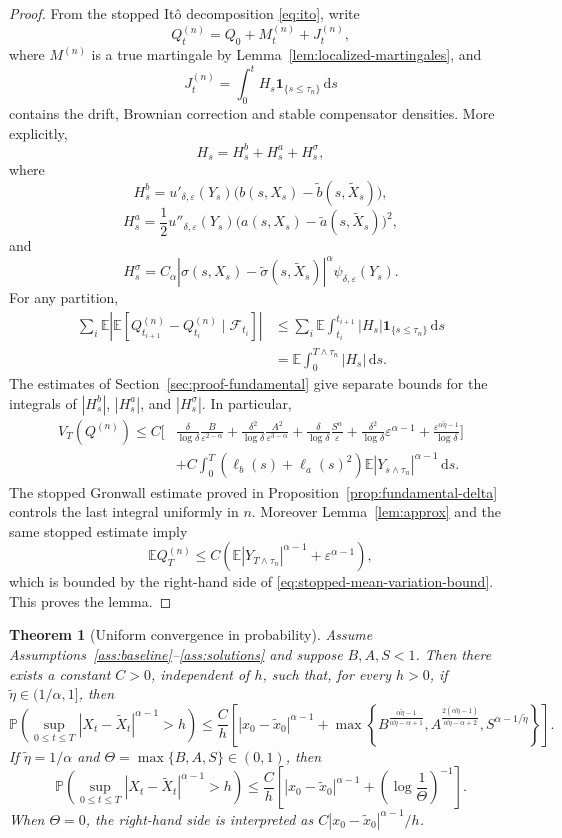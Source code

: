 \documentclass[11pt]{article}
\newtheorem{theorem}{Theorem}[section]
\newcommand{\E}{\mathbb{E}}
\newcommand{\Pbb}{\mathbb{P}}
\newcommand{\F}{\mathcal{F}}
\newcommand{\1}{\mathbf{1}}
\newcommand{\dd}{\,\mathrm{d}}
\newcommand{\wt}{\tilde}
\newcommand{\eps}{\varepsilon}
\begin{document}
\begin{proof}
From the stopped It\^o decomposition \eqref{eq:ito}, write
\[
  Q_t^{(n)}=Q_0+M_t^{(n)}+J_t^{(n)},
\]
where $M^{(n)}$ is a true martingale by Lemma~\ref{lem:localized-martingales}, and
\[
  J_t^{(n)}=\int_0^t H_s\1_{\{s\le\tau_n\}}\dd s
\]
contains the drift, Brownian correction and stable compensator densities. More explicitly,
\[
H_s=H_s^b+H_s^a+H_s^\sigma,
\]
where
\[
H_s^b=u'_{\delta,\eps}(Y_s)\bigl(b(s,X_s)-\wt b(s,\wt X_s)\bigr),
\]
\[
H_s^a=\frac12 u''_{\delta,\eps}(Y_s)\bigl(a(s,X_s)-\wt a(s,\wt X_s)\bigr)^2,
\]
and
\[
H_s^\sigma=C_\alpha|\sigma(s,X_s)-\wt\sigma(s,\wt X_s)|^\alpha
\psi_{\delta,\eps}(Y_s).
\]
For any partition,
\begin{align*}
\sum_i\E\left|\E\left[Q_{t_{i+1}}^{(n)}-Q_{t_i}^{(n)}\mid\F_{t_i}\right]\right|
&\le \sum_i\E\int_{t_i}^{t_{i+1}}|H_s|\1_{\{s\le\tau_n\}}\dd s\\
&=\E\int_0^{T\wedge\tau_n}|H_s|\dd s.
\end{align*}
The estimates of Section~\ref{sec:proof-fundamental} give separate bounds for the integrals of $|H_s^b|$, $|H_s^a|$, and $|H_s^\sigma|$. In particular,
\begin{align*}
V_T(Q^{(n)})
\le C\Bigg[&
\frac{\delta}{\log\delta}\frac{B}{\eps^{2-\alpha}}
+\frac{\delta^2}{\log\delta}\frac{A^2}{\eps^{3-\alpha}}
+\frac{\delta}{\log\delta}\frac{S^\alpha}{\eps}
+\frac{\delta^2}{\log\delta}\eps^{\alpha-1}
+\frac{\eps^{\alpha\wt\eta-1}}{\log\delta}
\Bigg]\\
&+C\int_0^T(\ell_b(s)+\ell_a(s)^2)\E|Y_{s\wedge\tau_n}|^{\alpha-1}\dd s.
\end{align*}
The stopped Gronwall estimate proved in Proposition~\ref{prop:fundamental-delta} controls the last integral uniformly in $n$. Moreover Lemma~\ref{lem:approx} and the same stopped estimate imply
\[
  \E Q_T^{(n)}\le C\left(\E|Y_{T\wedge\tau_n}|^{\alpha-1}+\eps^{\alpha-1}\right),
\]
which is bounded by the right-hand side of \eqref{eq:stopped-mean-variation-bound}. This proves the lemma.
\end{proof}

\begin{theorem}[Uniform convergence in probability]\label{thm:probability}
Assume Assumptions~\ref{ass:baseline}--\ref{ass:solutions} and suppose $B,A,S<1$. Then there exists a constant $C>0$, independent of $h$, such that, for every $h>0$, if $\wt\eta\in(1/\alpha,1]$, then
\[
\Pbb\left(\sup_{0\le t\le T}|X_t-\wt X_t|^{\alpha-1}>h\right)
\le \frac{C}{h}\left[|x_0-\wt x_0|^{\alpha-1}
+\max\left\{
B^{\frac{\alpha\wt\eta-1}{\alpha\wt\eta-\alpha+1}},
A^{\frac{2(\alpha\wt\eta-1)}{\alpha\wt\eta-\alpha+2}},
S^{\alpha-1/\wt\eta}
\right\}\right].
\]
If $\wt\eta=1/\alpha$ and $\Theta=\max\{B,A,S\}\in(0,1)$, then
\[
\Pbb\left(\sup_{0\le t\le T}|X_t-\wt X_t|^{\alpha-1}>h\right)
\le \frac{C}{h}\left[|x_0-\wt x_0|^{\alpha-1}
+\left(\log\frac1\Theta\right)^{-1}\right].
\]
When $\Theta=0$, the right-hand side is interpreted as $C|x_0-\wt x_0|^{\alpha-1}/h$.
\end{theorem}
\end{document}

